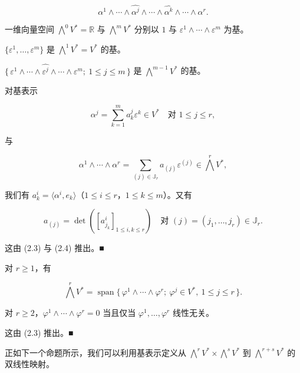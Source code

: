 \[
\alpha^{1}\wedge\cdots\wedge\widehat{\alpha^{j}}\wedge\cdots\wedge\widehat{\alpha^{k}}\wedge\cdots\wedge\alpha^{r}.
\]

\begin{example}

\begin{items}
\item

一维向量空间 $ \bigwedge^{0}V^{*} = \mathbb{R} $ 与 $ \bigwedge^{m}V^{*} $ 分别以 $ 1 $ 与 $ \varepsilon^{1}\wedge\cdots\wedge\varepsilon^{m} $ 为基。

\item

$ \{\varepsilon^{1},\ldots,\varepsilon^{m}\} $ 是 $ \bigwedge^{1}V^{*} = V^{*} $ 的基。

\item

$ \{\, \varepsilon^{1}\wedge\cdots\wedge\widehat{\varepsilon^{j}}\wedge\cdots\wedge\varepsilon^{m} ;\ 1 \le j \le m \,\} $ 是 $ \bigwedge^{m-1}V^{*} $ 的基。

\item

对基表示

\[
\alpha^{j} = \sum_{k=1}^{m} a^{j}_{k}\varepsilon^{k} \in V^{*} \quad \text{对 } 1 \le j \le r,
\]

与

\[
\alpha^{1}\wedge\cdots\wedge\alpha^{r} = \sum_{(j)\in\mathbb{J}_{r}} a_{(j)}\varepsilon^{(j)} \in \bigwedge^{r}V^{*},
\]

我们有 $ a^{i}_{k} = \langle\alpha^{i},e_{k}\rangle $（$ 1 \le i \le r $，$ 1 \le k \le m $）。又有

\[
a_{(j)} = \det\left(\left[a^{i}_{j_{k}}\right]_{1\le i,k\le r}\right) \quad \text{对 } (j) = (j_{1},\ldots,j_{r}) \in \mathbb{J}_{r}.
\]

\proofhead
这由 (2.3) 与 (2.4) 推出。\nobreak\hspace{0.35em}■
\item

对 $ r \ge 1 $，有

\[
\bigwedge^{r}V^{*} = \operatorname{span}\{\, \varphi^{1}\wedge\cdots\wedge\varphi^{r} ;\ \varphi^{j} \in V^{*},\ 1 \le j \le r \,\}.
\]
\item

对 $ r \ge 2 $，$ \varphi^{1}\wedge\cdots\wedge\varphi^{r} = 0 $ 当且仅当 $ \varphi^{1},\ldots,\varphi^{r} $ 线性无关。

\proofhead
这由 (2.3) 推出。\nobreak\hspace{0.35em}■
\end{items}

正如下一个命题所示，我们可以利用基表示定义从 $ \bigwedge^{r}V^{*}\times\bigwedge^{s}V^{*} $ 到 $ \bigwedge^{r+s}V^{*} $ 的双线性映射。

\end{example}

